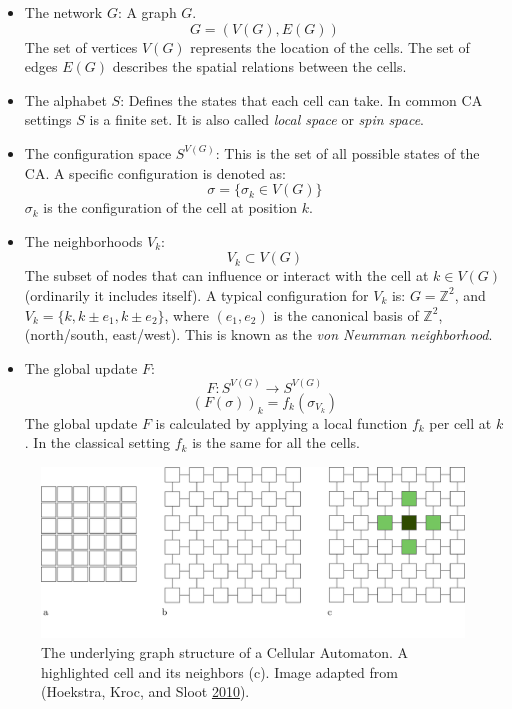 \documentclass[
  12pt,
  openany]{book}
\begin{document}
\begin{itemize}
\item
  The network \(G\):
  A graph \(G\).
  \[ G = (V(G), E(G)) \]
  The set of vertices \(V(G)\) represents the location of the cells. The set of edges \(E(G)\) describes the spatial relations between the cells.
\item
  The alphabet \(S\):
  Defines the states that each cell can take. In common CA settings \(S\) is a finite set. It is also called \emph{local space} or \emph{spin space}.
\item
  The configuration space \(S^{V(G)}\):
  This is the set of all possible states of the CA. A specific configuration is denoted as:
  \[ \sigma = \{\sigma_k \in V(G)\} \]
  \(\sigma_k\) is the configuration of the cell at position \(k\).
\item
  The neighborhoods \(V_k\):
  \[ V_k \subset  V(G) \]
  The subset of nodes that can influence or interact with the cell at \(k \in V(G)\) (ordinarily it includes itself). A typical configuration for \(V_k\) is: \(G = \mathds{Z}^2\), and \(V_k = \{k, k \pm e_1, k \pm e_2\}\), where \((e_1, e_2)\) is the canonical basis of \(\mathds{Z}^2\), (north/south, east/west). This is known as the \emph{von Neumman neighborhood}.
\item
  The global update \(F\):
  \[ F: S^{V(G)} \rightarrow S^{V(G)} \]
  \[ (F(\sigma))_k = f_k(\sigma_{V_k}) \]
  The global update \(F\) is calculated by applying a local function \(f_k\) per cell at \(k\). In the classical setting \(f_k\) is the same for all the cells.
\end{itemize}



\begin{figure}

{\centering \includegraphics[width=0.8\linewidth]{pics/graph_structure} 

}

\caption{The underlying graph structure of a Cellular Automaton. A highlighted cell and its neighbors (c). Image adapted from (Hoekstra, Kroc, and Sloot \protect\hyperlink{ref-hoekstra2010simulating}{2010}).}\label{fig:CA-lattice}
\end{figure}
\end{document}
